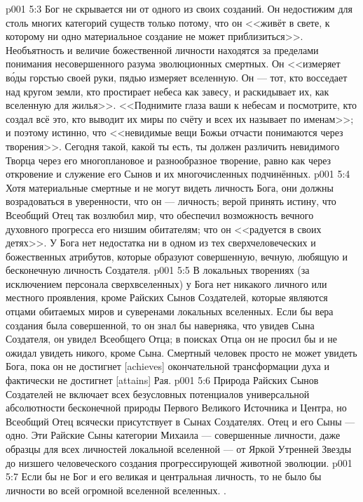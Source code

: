\vs p001 5:3 Бог не скрывается ни от одного из своих созданий. Он недостижим для столь многих категорий существ только потому, что он <<живёт в свете, к которому ни одно материальное создание не может приблизиться>>. Необъятность и величие божественной личности находятся за пределами понимания несовершенного разума эволюционных смертных. Он <<измеряет в\'оды горстью своей руки, пядью измеряет вселенную. Он --- тот, кто восседает над кругом земли, кто простирает небеса как завесу, и раскидывает их, как вселенную для жилья>>. <<Поднимите глаза ваши к небесам и посмотрите, кто создал всё это, кто выводит их миры по счёту и всех их называет по именам>>; и поэтому истинно, что <<невидимые вещи Божьи отчасти понимаются через творения>>. Сегодня такой, какой ты есть, ты должен различить невидимого Творца через его многоплановое и разнообразное творение, равно как через откровение и служение его Сынов и их многочисленных подчинённых.
\vs p001 5:4 Хотя материальные смертные и не могут видеть личность Бога, они должны возрадоваться в уверенности, что он --- личность; верой принять истину, что Всеобщий Отец так возлюбил мир, что обеспечил возможность вечного духовного прогресса его низшим обитателям; что он <<радуется в своих детях>>. У Бога нет недостатка ни в одном из тех сверхчеловеческих и божественных атрибутов, которые образуют совершенную, вечную, любящую и бесконечную личность Создателя.
\vs p001 5:5 \pc В локальных творениях (за исключением персонала сверхвселенных) у Бога нет никакого личного или местного проявления, кроме Райских Сынов Создателей, которые являются отцами обитаемых миров и суверенами локальных вселенных. Если бы вера создания была совершенной, то он знал бы наверняка, что увидев Сына Создателя, он увидел Всеобщего Отца; в поисках Отца он не просил бы и не ожидал увидеть никого, кроме Сына. Смертный человек просто не может увидеть Бога, пока он не достигнет [achieves] окончательной трансформации духа и фактически не достигнет [attains] Рая.
\vs p001 5:6 Природа Райских Сынов Создателей не включает всех безусловных потенциалов универсальной абсолютности бесконечной природы Первого Великого Источника и Центра, но Всеобщий Отец  всячески присутствует в Сынах Создателях. Отец и его Сыны --- одно. Эти Райские Сыны категории Михаила --- совершенные личности, даже образцы для всех личностей локальной вселенной --- от Яркой Утренней Звезды до низшего человеческого создания прогрессирующей животной эволюции.
\vs p001 5:7 \pc Если бы не Бог и его великая и центральная личность, то не было бы личности во всей огромной вселенной вселенных. .

